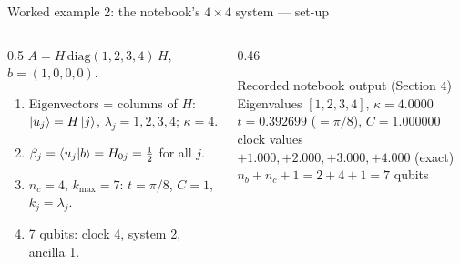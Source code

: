 \documentclass[aspectratio=169,11pt]{beamer}
\begin{document}
\begin{frame}{Worked example 2: the notebook's $4\times4$ system --- set-up}
  \begin{columns}[T]
    \begin{column}{0.5\textwidth}
      \small $A = H\,\mathrm{diag}(1, 2, 3, 4)\,H$, $b = (1, 0, 0, 0)$.
      \begin{enumerate}
        \item Eigenvectors = columns of $H$: $\ket{u_j} = H\ket j$, $\lambda_j = 1, 2, 3, 4$; $\kappa = 4$.
        \item $\beta_j = \braket{u_j|b} = H_{0j} = \frac12$ for all $j$.
        \item $n_c = 4$, $k_{\max} = 7$: $t = \pi/8$, $C = 1$, $k_j = \lambda_j$.
        \item 7 qubits: clock 4, system 2, ancilla 1.
      \end{enumerate}
    \end{column}
    \begin{column}{0.46\textwidth}
      \begin{block}{Recorded notebook output (Section 4)}
        \footnotesize
        Eigenvalues $[1, 2, 3, 4]$, $\kappa = 4.0000$\\
        $t = 0.392699$ ($=\pi/8$), $C = 1.000000$\\
        clock values $+1.000, +2.000, +3.000, +4.000$ (exact)\\
        $n_b + n_c + 1 = 2 + 4 + 1 = 7$ qubits
      \end{block}
    \end{column}
  \end{columns}
\end{frame}
\end{document}
